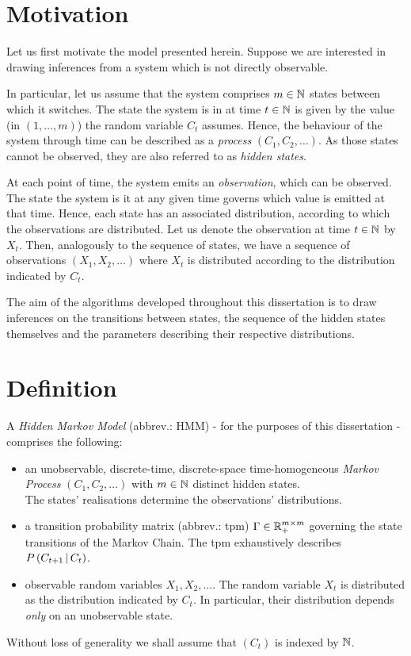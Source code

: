 \section{Motivation}

Let us first motivate the model presented herein. Suppose we are interested in drawing inferences from a system which is not directly observable. 

In particular, let us assume that the system comprises $m \in \mathbb{N}$ states between which it switches. The state the system is in at time $t \in \mathbb{N}$ is given by the value (in $\left(1, \dots, m\right)$) the random variable $C_t$ assumes. Hence, the behaviour of the system through time can be described as a \textit{process} $\left(C_1, C_2, \dots \right)$. As those states cannot be observed, they are also referred to as \textit{hidden states}. 

At each point of time, the system emits an \textit{observation}, which can be observed. The state the system is it at any given time governs which value is emitted at that time. Hence, each state has an associated distribution, according to which the observations are distributed. Let us denote the observation at time $t \in \mathbb{N}$ by $X_t$. Then, analogously to the sequence of states, we have a sequence of observations $\left(X_1, X_2, \dots \right)$ where $X_t$ is distributed according to the distribution indicated by $C_t$. 

The aim of the algorithms developed throughout this dissertation is to draw inferences on the transitions between states, the sequence of the hidden states themselves  and the parameters describing their respective distributions. 





\section{Definition}


A \textit{Hidden Markov Model} (abbrev.: HMM) - for the purposes of this dissertation - comprises the following: 
\begin{itemize}
\item an unobservable, discrete-time, discrete-space time-homogeneous \textit{Markov Process} 
$\left(C_1, C_2, \dots \right)$ with $m \in \mathbb{N}$ distinct hidden states.\\
The states' realisations determine the observations' distributions. 

\item a transition probability matrix (abbrev.: tpm) $\Gamma \in \mathbb{R}_+^{m \times m}$ governing the state transitions of the Markov Chain. The tpm exhaustively describes $P\left(C_{t+1} \, | \, C_t\right)$.  

\item observable random variables $X_1, X_2, \dots$. The random variable $X_t$ is distributed as the distribution indicated by $C_t$. In particular, their distribution depends \textit{only} on an unobservable state. 
\end{itemize}
Without loss of generality we shall assume that $(C_t)$ is indexed by $\mathbb{N}$. 


